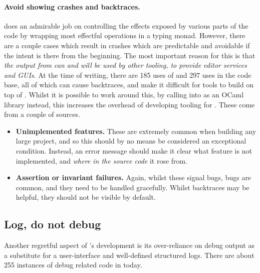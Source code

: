 \paragraph{Avoid showing crashes and backtraces.}  does an admirable job
on controlling the effects exposed by various parts of the code by wrapping
most effectful operations in a typing monad. However, there are a couple cases which result in crashes which
are predictable and avoidable if the intent is there from the beginning. The
most important reason for this is that \emph{the output from  can and
will be used by other tooling, to provide editor services and
GUIs}.\label{sn:gui-issues} At the time of writing, there are 185 uses of
 and 297 uses  in the code
base, all of which can cause backtraces, and make it difficult for
tools to build on top of . Whilst it is possible to work
around this, by calling into  as an OCaml library instead,
this increases the overhead of developing tooling for .
These come from a couple of sources.
\begin{itemize}
    \item \textbf{Unimplemented features.} These are extremely common when
        building any large project, and so this should by no means be
        considered an exceptional condition. Instead, an error message should
        make it clear what feature is not implemented, and \emph{where in the
        source code} it rose from.
    \item \textbf{Assertion or invariant failures.} Again, whilst these signal
        bugs, bugs are common, and they need to be handled gracefully. Whilst
        backtraces may be helpful, they should not be visible by default.
\end{itemize}

\subsection{Log, do not debug}

Another regretful aspect of 's development is its over-reliance on debug
output as a substitute for a user-interface and well-defined structured logs.
There are about 255 instances of debug related code in  today.

